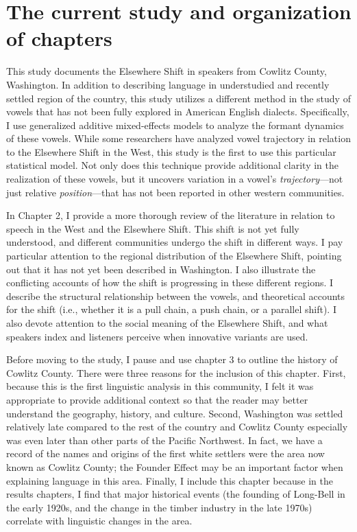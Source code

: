 \section{The current study and organization of chapters}

This study documents the Elsewhere Shift in speakers from Cowlitz County, Washington. In addition to describing language in understudied and recently settled region of the country, this study utilizes a different method in the study of vowels that has not been fully explored in American English dialects. Specifically, I use generalized additive mixed-effects models to analyze the formant dynamics of these vowels. While some researchers have analyzed vowel trajectory in relation to the Elsewhere Shift in the West, this study is the first to use this particular statistical model. Not only does this technique provide additional clarity in the realization of these vowels, but it uncovers variation in a vowel's \textit{trajectory}---not just relative \textit{position}---that has not been reported in other western communities.

In Chapter 2, I provide a more thorough review of the literature in relation to speech in the West and the Elsewhere Shift. This shift is not yet fully understood, and different communities undergo the shift in different ways. I pay particular attention to the regional distribution of the Elsewhere Shift, pointing out that it has not yet been described in Washington. I also illustrate the conflicting accounts of how the shift is progressing in these different regions. I describe the structural relationship between the vowels, and theoretical accounts for the shift (i.e., whether it is a pull chain, a push chain, or a parallel shift). I also devote attention to the social meaning of the Elsewhere Shift, and what speakers index and listeners perceive when innovative variants are used.

Before moving to the study, I pause and use chapter 3 to outline the history of Cowlitz County. There were three reasons for the inclusion of this chapter. First, because this is the first linguistic analysis in this community, I felt it was appropriate to provide additional context so that the reader may better understand the geography, history, and culture. Second, Washington was settled relatively late compared to the rest of the country and Cowlitz County especially was even later than other parts of the Pacific Northwest. In fact, we have a record of the names and origins of the first white settlers were the area now known as Cowlitz County; the Founder Effect \citep{mufwene_1996} may be an important factor when explaining language in this area. Finally, I include this chapter because in the results chapters, I find that major historical events (the founding of Long-Bell in the early 1920s, and the change in the timber industry in the late 1970s) correlate with linguistic changes in the area.

